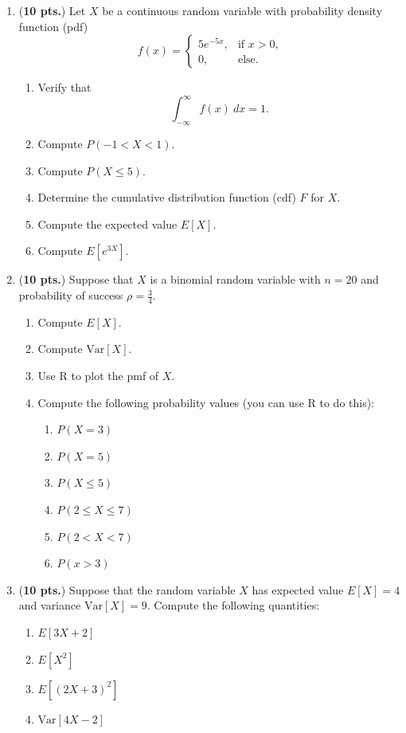 \documentclass[13pt]{article}\usepackage[]{graphicx}\usepackage[]{color}
\begin{document}
{\begin{enumerate}
  \newpage 
  
  \item ({\bf 10 pts.})  Let $X$ be a continuous random variable with probability density function (pdf)
  \[ f(x) = \left\{\begin{array}{ll} 5e^{-5x}, & \mbox{if $x > 0$,} \\ 0, & \mbox{else.}  \end{array} \right.  \]
  \begin{enumerate}
      \item Verify that 
      \[ \int_{-\infty}^{\infty}f(x) \ dx = 1. \]
      \item Compute $P(-1 < X < 1)$.
      \item Compute $P(X \leq 5)$.
      \item Determine the cumulative distribution function (cdf) $F$ for $X$.  
      \item Compute the expected value $E[X]$.
      \item Compute $E[e^{3X}]$.
  \end{enumerate}
  
  \newpage
  
  \item ({\bf 10 pts.}) Suppose that $X$ is a binomial random variable with $n=20$ and probability of success $\rho = \frac{3}{4}$. 
  \begin{enumerate}
      \item Compute $E[X]$. 
      \item Compute $\text{Var}[X]$.
      \item Use R to plot the pmf of $X$. 
      \item Compute the following probability values (you can use R to do this):
      \begin{enumerate}
          \item $P(X = 3)$
          \item $P(X = 5)$
          \item $P(X \leq 5)$
          \item $P(2 \leq X \leq 7 )$
          \item $P(2 < X < 7)$
          \item $P(x > 3)$
      \end{enumerate}
  \end{enumerate}
  
  \newpage
  
  \item ({\bf 10 pts.}) Suppose that the random variable $X$ has expected value $E[X] = 4$ and variance $\text{Var}[X] = 9$. Compute the following quantities:
  \begin{enumerate}
      \item $E[3X+2]$
      \item $E[X^2]$
      \item $E[(2X+3)^2]$
      \item $\text{Var}[4X - 2]$
  \end{enumerate}
    

\end{enumerate}}
\end{document}
